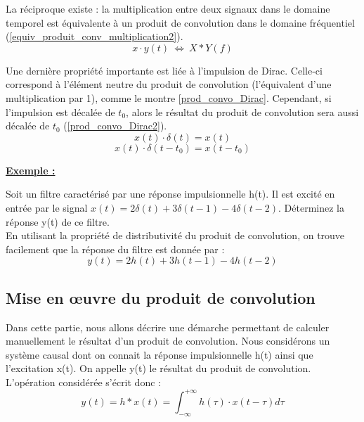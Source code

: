 	La réciproque existe : la multiplication entre deux signaux dans le domaine temporel est équivalente à un produit de convolution dans le domaine fréquentiel (\ref{equiv_produit_conv_multiplication2}).
	\begin{equation}\label{equiv_produit_conv_multiplication2}
	x \cdot y(t)~\Longleftrightarrow~X*Y(f)
	\end{equation}

	Une dernière propriété importante est liée à l'impulsion de Dirac. Celle-ci correspond à l'élément neutre du produit de convolution (l'équivalent d'une multiplication par 1), comme le montre \ref{prod_convo_Dirac}. Cependant, si l'impulsion est décalée de $t_{0}$, alors le résultat du produit de convolution sera aussi décalée de $t_{0}$ (\ref{prod_convo_Dirac2}).
	\begin{equation}\label{prod_convo_Dirac}
	x(t)\cdot \delta(t)=x(t)
	\end{equation}
	\begin{equation}\label{prod_convo_Dirac2}
	x(t)\cdot \delta(t-t_{0})=x(t-t_{0})
	\end{equation}
	
	\textbf{\underline{Exemple :}}
	
	Soit un filtre caractérisé par une réponse impulsionnelle h(t). Il est excité en entrée par le signal $x(t) = 2\delta(t)+3\delta(t-1)-4\delta(t-2)$. Déterminez la réponse y(t) de ce filtre.\\
	
	En utilisant la propriété de distributivité du produit de convolution, on trouve facilement que la réponse du filtre est donnée par :
	\begin{equation*}
	y(t)=2h(t)+3h(t-1)-4h(t-2)
	\end{equation*}
	
	\vspace{1\baselineskip}
	
	
	
	\subsection{Mise en œuvre du produit de convolution}
	Dans cette partie, nous allons décrire une démarche permettant de calculer manuellement  le résultat d'un produit de convolution. Nous considérons un système causal dont on connait la réponse impulsionnelle h(t) ainsi que l'excitation x(t). On appelle y(t) le résultat du produit de convolution. L'opération considérée s'écrit donc :
	\begin{equation*}
	y(t)=h*x(t)=\int_{-\infty}^{+ \infty} h(\tau) \cdot x(t-\tau)d\tau 
	\end{equation*} 
	
